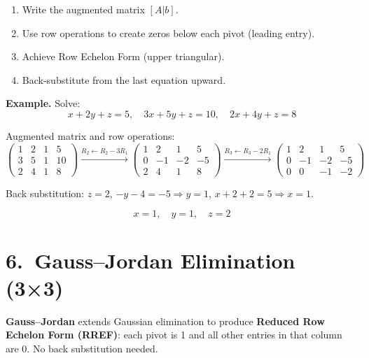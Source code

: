 \documentclass[12pt]{article}
\begin{document}
\begin{derivbox}[Steps]
\begin{enumerate}[leftmargin=18pt, itemsep=4pt]
  \item Write the augmented matrix $[A|b]$.
  \item Use row operations to create zeros below each pivot (leading entry).
  \item Achieve Row Echelon Form (upper triangular).
  \item Back-substitute from the last equation upward.
\end{enumerate}
\end{derivbox}

\textbf{Example.} Solve:
\[
x + 2y + z = 5, \quad 3x + 5y + z = 10, \quad 2x + 4y + z = 8
\]

Augmented matrix and row operations:
\[
\begin{pmatrix}1&2&1&5\\3&5&1&10\\2&4&1&8\end{pmatrix}
\xrightarrow{R_2\leftarrow R_2-3R_1}
\begin{pmatrix}1&2&1&5\\0&-1&-2&-5\\2&4&1&8\end{pmatrix}
\xrightarrow{R_3\leftarrow R_3-2R_1}
\begin{pmatrix}1&2&1&5\\0&-1&-2&-5\\0&0&-1&-2\end{pmatrix}
\]

Back substitution: $z = 2$, $-y - 4 = -5 \Rightarrow y = 1$, $x + 2 + 2 = 5 \Rightarrow x = 1$.

\[
\boxed{x = 1,\quad y = 1,\quad z = 2}
\]

\section{6.\ Gauss--Jordan Elimination (3×3)}

\begin{defbox}
\textbf{Gauss--Jordan} extends Gaussian elimination to produce \textbf{Reduced Row Echelon Form (RREF)}: each pivot is 1 and all other entries in that column are 0. No back substitution needed.
\end{defbox}
\end{document}
